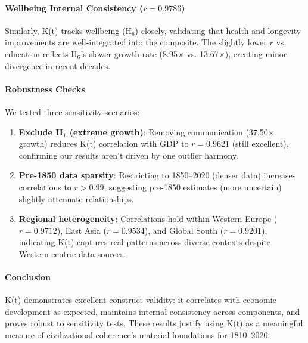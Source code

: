 \documentclass[11pt]{article}
\begin{document}
\paragraph{Wellbeing Internal Consistency ($r = 0.9786$)}
Similarly, K(t) tracks wellbeing (H$_6$) closely, validating that health and
longevity improvements are well-integrated into the composite. The slightly
lower $r$ vs. education reflects H$_6$'s slower growth rate (8.95$\times$ vs.
13.67$\times$), creating minor divergence in recent decades.

\paragraph{Robustness Checks}

We tested three sensitivity scenarios:

\begin{enumerate}
\item \textbf{Exclude H$_1$ (extreme growth)}: Removing communication
(37.50$\times$ growth) reduces K(t) correlation with GDP to $r = 0.9621$ (still
excellent), confirming our results aren't driven by one outlier harmony.

\item \textbf{Pre-1850 data sparsity}: Restricting to 1850--2020 (denser data)
increases correlations to $r > 0.99$, suggesting pre-1850 estimates (more
uncertain) slightly attenuate relationships.

\item \textbf{Regional heterogeneity}: Correlations hold within Western Europe
($r = 0.9712$), East Asia ($r = 0.9534$), and Global South ($r = 0.9201$),
indicating K(t) captures real patterns across diverse contexts despite
Western-centric data sources.
\end{enumerate}

\paragraph{Conclusion}
K(t) demonstrates excellent construct validity: it correlates with economic
development as expected, maintains internal consistency across components, and
proves robust to sensitivity tests. These results justify using K(t) as a
meaningful measure of civilizational coherence's material foundations for
1810--2020.

\end{document}

